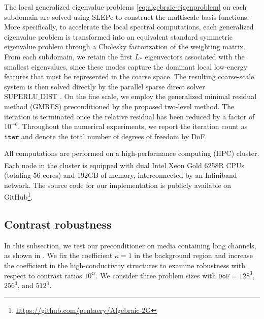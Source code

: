\documentclass[preprint,12pt]{elsarticle}
\begin{document}
  The local generalized eigenvalue problems \cref{eq:algebraic-eigenproblem} on
  each subdomain are solved using SLEPc \cite{hernandez2005slepc} to construct
  the multiscale basis functions. More specifically, to accelerate the local
  spectral computations, each generalized eigenvalue problem is transformed into
  an equivalent standard symmetric eigenvalue problem through a Cholesky factorization
  of the weighting matrix. From each subdomain, we retain the first $L_{*}$ eigenvectors
  associated with the smallest eigenvalues, since these modes capture the
  dominant local low-energy features that must be represented in the coarse
  space. The resulting coarse-scale system is then solved directly by the parallel
  sparse direct solver $\text{SUPERLU\_DIST}$ \cite{li2003superlu_dist}. On the
  fine scale, we employ the generalized minimal residual method (GMRES) preconditioned
  by the proposed two-level method. The iteration is terminated once the
  relative residual has been reduced by a factor of $10^{-6}$. Throughout the numerical
  experiments, we report the iteration count as $\mathtt{iter}$ and denote the
  total number of degrees of freedom by DoF.

  All computations are performed on a high-performance computing (HPC) cluster. Each
  node in the cluster is equipped with dual Intel\textsuperscript{\textregistered}
  Xeon\textsuperscript{\textregistered} Gold 6258R CPUs (totaling 56 cores) and 192GB
  of memory, interconnected by an Infiniband network. The source code for our implementation
  is publicly available on GitHub\footnote{\href{https://github.com/pentaery/Algebraic-2G}{https://github.com/pentaery/Algebraic-2G}}.

  \subsection{Contrast robustness}
  In this subsection, we test our preconditioner on media containing long channels,
  as shown in . We fix the coefficient $\kappa = 1$ in the
  background region and increase the coefficient in the high-conductivity structures
  to examine robustness with respect to contrast ratios $10^{\mathsf{cr}}$. We
  consider three problem sizes with $\mathtt{DoF}=128^{3}$, $256^{3}$, and
  $512^{3}$.
\end{document}
